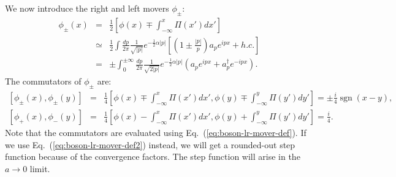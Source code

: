 \documentclass[aps,prb,superscriptaddress,nofootinbib]{revtex4}
\begin{document}
We now introduce the right and left movers $\phi_\pm$:
\begin{eqnarray}
	\phi_\pm(x) &=& \frac{1}{2}\left[\phi(x)\mp\int_{-\infty}^x \Pi(x')dx'\right] \label{eq:boson-lr-mover-def}\\
	&\simeq& \frac{1}{2} \int \frac{dp}{2\pi} \frac{1}{\sqrt{|p|}}e^{-\frac{1}{2}\alpha|p|}\left[\left(1\pm\frac{|p|}{p}\right)a_p e^{ipx}+h.c.\right] \nonumber \\
	&=& \pm\int_0^{\pm\infty} \frac{dp}{2\pi}\frac{1}{\sqrt{2|p|}}e^{-\frac{1}{2}\alpha|p|} \left(a_p e^{ipx} + a_p^\dagger e^{-ipx} \right). \label{eq:boson-lr-mover-def2}
\end{eqnarray}
The commutators of $\phi_\pm$ are:
\begin{eqnarray}
	\left[\phi_\pm(x),\phi_\pm(y)\right] 
	&=& \frac{1}{4}\left[\phi(x)\mp\int_{-\infty}^x \Pi(x')dx',\phi(y)\mp\int_{-\infty}^y \Pi(y')dy'\right]
	= \pm\frac{i}{4} \operatorname{sgn}(x-y), \\
	\left[\phi_+(x),\phi_-(y)\right] 
	&=& \frac{1}{4}\left[\phi(x)-\int_{-\infty}^x \Pi(x')dx',\phi(y)+\int_{-\infty}^y \Pi(y')dy'\right]
	= \frac{i}{4}.
\end{eqnarray}
Note that the commutators are evaluated using Eq.~(\ref{eq:boson-lr-mover-def}).
If we use Eq.~(\ref{eq:boson-lr-mover-def2}) instead, we will get a rounded-out step function because of the convergence factors.
The step function will arise in the $a\rightarrow 0$ limit.
\end{document}
